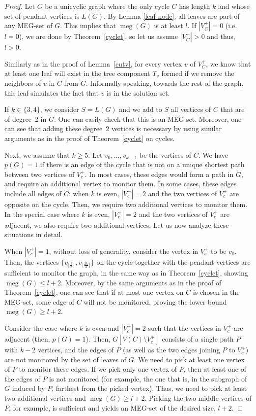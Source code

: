\documentclass[10pt,a4paper]{article}
\DeclareMathOperator{\MEG}{meg}
\begin{document}
\begin{proof}
Let $G$ be a unicyclic graph where the only cycle $C$ has length $k$ and whose set of pendant vertices is $L(G)$. By Lemma \ref{leaf-node}, all leaves are part of any MEG-set of $G$. This implies that $\MEG(G)$ is at least $l$. If $|V_C^+|=0$ (i.e. $l = 0$), we are done by Theorem~\ref{cyclet}, so let us assume $|V_C^+|>0$ and thus, $l>0$.

Similarly as in the proof of Lemma~\ref{cutv}, for every vertex $v$ of $V_C^+$, we know that at least one leaf will exist in the tree component $T_v$ formed if we remove the neighbors of $v$ in $C$ from $G$. Informally speaking, towards the rest of the graph, this leaf simulates the fact that $v$ is in the solution set.

If $k \in \{3,4\}$, we consider $S=L(G)$ and we add to $S$ all vertices of $C$ that are of degree~2 in $G$. One can easily check that this is an MEG-set. Moreover, one can see that adding these degree~2 vertices is necessary by using similar arguments as in the proof of Theorem~\ref{cyclet} on cycles.


Next, we assume that $k\geq 5$. Let $v_0,\ldots,v_{k-1}$ be the vertices of $C$. We have $p(G)=1$ if there is an edge of the cycle that is not on a unique shortest path between two vertices of $V_c^{+}$. In most cases, these edges would form a path in $G$, and require an additional vertex to monitor them. In some cases, these edges include all edges of $C$: when $k$ is even, $|V_c^{+}|=2$ and the two vertices of $V_c^{+}$ are opposite on the cycle. Then, we require two additional vertices to monitor them. In the special case where $k$ is even, $|V_c^{+}|=2$ and the two vertices of $V_c^{+}$ are adjacent, we also require two additional vertices. Let us now analyze these situations in detail.

When $|V_c^{+}| = 1$, without loss of generality, consider the vertex in $V_c^{+}$ to be $v_0$. Then, the vertices \(\{v_{\lfloor\frac{k}{3}\rfloor},v_{\lfloor\frac{2k}{3}\rfloor}\}\) on the cycle together with the pendant vertices are sufficient to monitor the graph, in the same way as in Theorem~\ref{cyclet}, showing $\MEG(G)\leq l+2$. Moreover, by the same arguments as in the proof of Theorem~\ref{cyclet}, one can see that if at most one vertex on $C$ is chosen in the MEG-set, some edge of $C$ will not be monitored, proving the lower bound $\MEG(G)\geq l+2$.

Consider the case where $k$ is even and $|V_c^{+}|=2$ such that the vertices in $V_c^{+}$ are adjacent (then, $p(G)=1$). Then, $G[V(C)\setminus V_{c}^{+}]$ consists of a single path $P$ with $k-2$ vertices, and the edges of $P$ (as well as the two edges joining $P$ to $V_{c}^{+}$) are not monitored by the set of leaves of $G$. We need to pick at least one vertex of $P$ to monitor these edges. If we pick only one vertex of $P$, then at least one of the edges of $P$ is not monitored (for example, the one that is, in the subgraph of $G$ induced by $P$, farthest from the picked vertex). Thus, we need to pick at least two additional vertices and $\MEG(G)\geq l+2$. Picking the two middle vertices of $P$, for example, is sufficient and yields an MEG-set of the desired size, $l+2$.


\end{proof}
\end{document}
